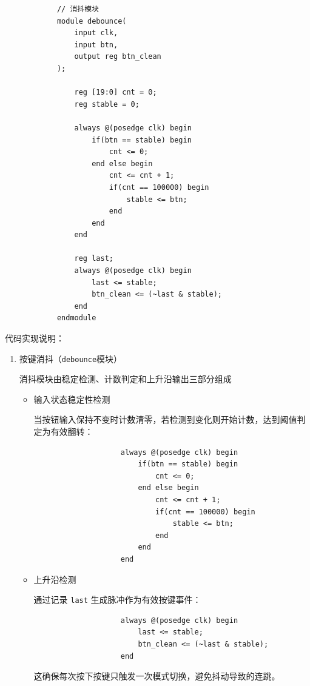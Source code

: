 \documentclass{SYSUReport}
\begin{document}
\begin{enumerate}[label={\chinese*、},labelsep=0pt]
\begin{enumerate}[label = \arabic*、]
\begin{verbatim}
            // 消抖模块
            module debounce(
                input clk,
                input btn,
                output reg btn_clean
            );

                reg [19:0] cnt = 0;
                reg stable = 0;

                always @(posedge clk) begin
                    if(btn == stable) begin
                        cnt <= 0;
                    end else begin
                        cnt <= cnt + 1;
                        if(cnt == 100000) begin
                            stable <= btn;
                        end
                    end
                end

                reg last;
                always @(posedge clk) begin
                    last <= stable;
                    btn_clean <= (~last & stable);
                end
            endmodule
        \end{verbatim}
        代码实现说明：
        \begin{enumerate}[label = （\arabic*）、]
            \item 按键消抖（\verb|debounce|模块）
            
            消抖模块由稳定检测、计数判定和上升沿输出三部分组成
            \begin{itemize}
                \item 输入状态稳定性检测

                当按钮输入保持不变时计数清零，若检测到变化则开始计数，达到阈值判定为有效翻转：
                \begin{verbatim}
                    always @(posedge clk) begin
                        if(btn == stable) begin
                            cnt <= 0;
                        end else begin
                            cnt <= cnt + 1;
                            if(cnt == 100000) begin
                                stable <= btn;
                            end
                        end
                    end
                \end{verbatim}
                
                \item 上升沿检测
                
                通过记录 \verb|last| 生成脉冲作为有效按键事件：
                \begin{verbatim}
                    always @(posedge clk) begin
                        last <= stable;
                        btn_clean <= (~last & stable);
                    end
                \end{verbatim}
                这确保每次按下按键只触发一次模式切换，避免抖动导致的连跳。
            \end{itemize}
            

\end{enumerate}
\end{enumerate}
\end{enumerate}
\end{document}
